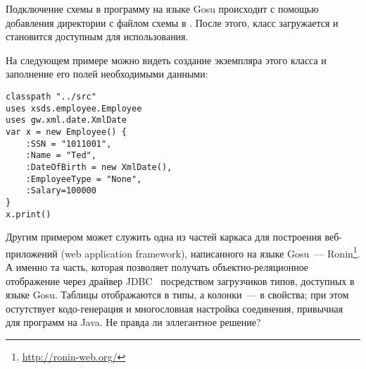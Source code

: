 Подключение схемы в программу на языке Gosu происходит с помощью добавления директории с файлом схемы в .
После этого, класс  загружается и становится доступным для использования.

На следующем примере можно видеть создание экземпляра этого класса и заполнение его полей необходимыми данными:

\begin{lstlisting}[caption={Содержимое файла \texttt{test\_project.gsp} из примера~\ref{gosu-project-layout}.}, label=gosu-xsd-loader]
classpath "../src"
uses xsds.employee.Employee
uses gw.xml.date.XmlDate
var x = new Employee() { 
    :SSN = "1011001", 
    :Name = "Ted", 
    :DateOfBirth = new XmlDate(), 
    :EmployeeType = "None", 
    :Salary=100000 
}
x.print()
\end{lstlisting}


Другим примером может служить одна из частей каркаса для построения веб-приложений (web application framework), написанного на языке Gosu~--- Ronin\footnote{\url{http://ronin-web.org/}}.
А именно та часть, которая позволяет получать объектно-реляционное отображение через драйвер JDBC~\cite{jdbc-book} посредством загрузчиков типов, доступных в языке Gosu.
Таблицы отображаются в типы, а колонки~--- в свойства; при этом остутствует кодо-генерация и многословная настройка соединения, привычная для программ на Java. Не правда ли эллегантное решение?



